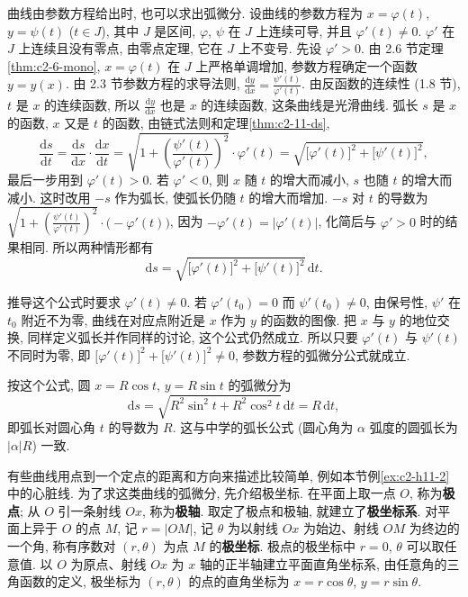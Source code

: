 \documentclass[UTF8,openany]{ctexbook}
\theoremstyle{chinesetextbook}
\newcommand{\dd}{\mathrm d}
\begin{document}
曲线由参数方程给出时, 也可以求出弧微分. 设曲线的参数方程为 $x=\varphi(t)$, $y=\psi(t)$ ($t\in J$), 其中 $J$ 是区间, $\varphi$, $\psi$ 在 $J$ 上连续可导, 并且 $\varphi'(t)\ne0$. $\varphi'$ 在 $J$ 上连续且没有零点, 由零点定理, 它在 $J$ 上不变号. 先设 $\varphi'>0$. 由 2.6 节定理\ref{thm:c2-6-mono}, $x=\varphi(t)$ 在 $J$ 上严格单调增加, 参数方程确定一个函数 $y=y(x)$. 由 2.3 节参数方程的求导法则, $\displaystyle\frac{\dd y}{\dd x}=\frac{\psi'(t)}{\varphi'(t)}$. 由反函数的连续性 (1.8 节), $t$ 是 $x$ 的连续函数, 所以 $\displaystyle\frac{\dd y}{\dd x}$ 也是 $x$ 的连续函数, 这条曲线是光滑曲线. 弧长 $s$ 是 $x$ 的函数, $x$ 又是 $t$ 的函数, 由链式法则和定理\ref{thm:c2-11-ds},
\[
\frac{\dd s}{\dd t}=\frac{\dd s}{\dd x}\cdot\frac{\dd x}{\dd t}=\sqrt{1+\left(\frac{\psi'(t)}{\varphi'(t)}\right)^2}\cdot\varphi'(t)=\sqrt{\bigl[\varphi'(t)\bigr]^2+\bigl[\psi'(t)\bigr]^2},
\]
最后一步用到 $\varphi'(t)>0$. 若 $\varphi'<0$, 则 $x$ 随 $t$ 的增大而减小, $s$ 也随 $t$ 的增大而减小. 这时改用 $-s$ 作为弧长, 使弧长仍随 $t$ 的增大而增加. $-s$ 对 $t$ 的导数为 $\displaystyle\sqrt{1+\left(\frac{\psi'(t)}{\varphi'(t)}\right)^2}\cdot\bigl(-\varphi'(t)\bigr)$, 因为 $-\varphi'(t)=|\varphi'(t)|$, 化简后与 $\varphi'>0$ 时的结果相同. 所以两种情形都有
\[
\dd s=\sqrt{\bigl[\varphi'(t)\bigr]^2+\bigl[\psi'(t)\bigr]^2}\,\dd t.
\]

推导这个公式时要求 $\varphi'(t)\ne0$. 若 $\varphi'(t_0)=0$ 而 $\psi'(t_0)\ne0$, 由保号性, $\psi'$ 在 $t_0$ 附近不为零, 曲线在对应点附近是 $x$ 作为 $y$ 的函数的图像. 把 $x$ 与 $y$ 的地位交换, 同样定义弧长并作同样的讨论, 这个公式仍然成立. 所以只要 $\varphi'(t)$ 与 $\psi'(t)$ 不同时为零, 即 $\bigl[\varphi'(t)\bigr]^2+\bigl[\psi'(t)\bigr]^2\ne0$, 参数方程的弧微分公式就成立.

按这个公式, 圆 $x=R\cos t$, $y=R\sin t$ 的弧微分为
\[
\dd s=\sqrt{R^2\sin^2t+R^2\cos^2t}\,\dd t=R\,\dd t,
\]
即弧长对圆心角 $t$ 的导数为 $R$. 这与中学的弧长公式 (圆心角为 $\alpha$ 弧度的圆弧长为 $|\alpha|R$) 一致.

有些曲线用点到一个定点的距离和方向来描述比较简单, 例如本节例\ref{ex:c2-h11-2} 中的心脏线. 为了求这类曲线的弧微分, 先介绍极坐标. 在平面上取一点 $O$, 称为\textbf{极点}; 从 $O$ 引一条射线 $Ox$, 称为\textbf{极轴}. 取定了极点和极轴, 就建立了\textbf{极坐标系}. 对平面上异于 $O$ 的点 $M$, 记 $r=|OM|$, 记 $\theta$ 为以射线 $Ox$ 为始边、射线 $OM$ 为终边的一个角, 称有序数对 $(r,\theta)$ 为点 $M$ 的\textbf{极坐标}. 极点的极坐标中 $r=0$, $\theta$ 可以取任意值. 以 $O$ 为原点、射线 $Ox$ 为 $x$ 轴的正半轴建立平面直角坐标系, 由任意角的三角函数的定义, 极坐标为 $(r,\theta)$ 的点的直角坐标为 $x=r\cos\theta$, $y=r\sin\theta$.
\end{document}
